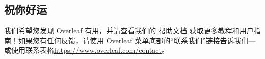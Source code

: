 \documentclass{article}
\begin{document}
\subsection{祝你好运}

我们希望您发现 Overleaf 有用，并请查看我们的 \href{https://www.overleaf.com/learn}{帮助文档} 获取更多教程和用户指南！如果您有任何反馈，请使用 Overleaf 菜单底部的“联系我们”链接告诉我们---或使用联系表格\url{https://www.overleaf.com/contact}。%



\end{document}
